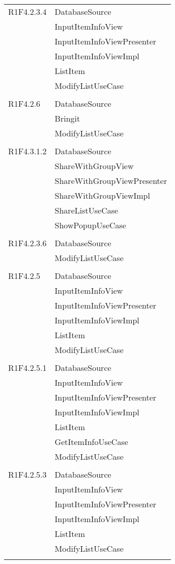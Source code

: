 \begin{center}
\begin{longtable}{|p{7cm}|p{7cm}|}
		R1F4.2.3.4 & DatabaseSource \\ & InputItemInfoView \\ & InputItemInfoViewPresenter \\ & InputItemInfoViewImpl \\ & ListItem \\ & ModifyListUseCase \\ & \\ \hline
		R1F4.2.6 & DatabaseSource \\ & Bringit \\ & ModifyListUseCase \\ & \\ \hline
		R1F4.3.1.2 & DatabaseSource \\ & ShareWithGroupView \\ & ShareWithGroupViewPresenter \\ & ShareWithGroupViewImpl \\ & ShareListUseCase \\ & ShowPopupUseCase \\ & \\ \hline
		R1F4.2.3.6 & DatabaseSource \\ & ModifyListUseCase \\ & \\ \hline
		R1F4.2.5 & DatabaseSource \\ & InputItemInfoView \\ & InputItemInfoViewPresenter \\ & InputItemInfoViewImpl \\ & ListItem \\ & ModifyListUseCase \\ & \\ \hline
		R1F4.2.5.1 & DatabaseSource \\ & InputItemInfoView \\ & InputItemInfoViewPresenter \\ & InputItemInfoViewImpl \\ & ListItem \\ & GetItemInfoUseCase \\ & ModifyListUseCase \\ & \\ \hline
		R1F4.2.5.3 & DatabaseSource \\ & InputItemInfoView \\ & InputItemInfoViewPresenter \\ & InputItemInfoViewImpl \\ & ListItem \\ & ModifyListUseCase \\ & \\ \hline

\end{longtable}
\end{center}
